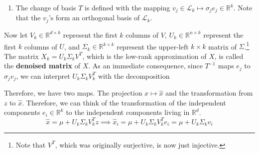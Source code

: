 \begin{theorem}
\begin{enumerate}
        \item The change of basis $T$ is defined with the mapping $v_j \in \mathcal{L}_k \mapsto \sigma_j e_j \in \mathbb{R}^k$. Note that the $v_j$'s form an orthogonal basis of $\mathcal{L}_k$. 
      \end{enumerate} 
      Now let $V_k \in \mathbb{R}^{d \times k}$ represent the first $k$ columns of $V$, $U_k \in \mathbb{R}^{n \times k}$ represent the first $k$ columns of $U$, and $\Sigma_k \in \mathbb{R}^{k \times k}$ represent the upper-left $k \times k$ matrix of $\Sigma$.\footnote{Note that $V^T$, which was originally surjective, is now just injective.} The matrix $X_k = U_k \Sigma_k V^T$, which is the low-rank approximation of $X$, is called the \textbf{denoised matrix} of $X$. As an immediate consequence, since $T^{-1}$ maps $e_j$ to $\sigma_j v_j$, we can interpret $U_k \Sigma_k V_k^T$ with the decomposition 
      \begin{center}
      \end{center}

      Therefore, we have two maps. The projection $x \mapsto \hat{x}$ and the transformation from $z$ to $\hat{x}$. Therefore, we can think of the transformation of the independent components $e_i \in \mathbb{R}^k$ to the independent components living in $\mathbb{R}^d$. 
      \begin{equation}
        \hat{x} = \mu + U_k \Sigma_k V_k^T z \implies \hat{x}_i = \mu + U_k \Sigma_k V_k^T e_i = \mu + U_k \Sigma_k v_i 
      \end{equation}
    \end{theorem}
